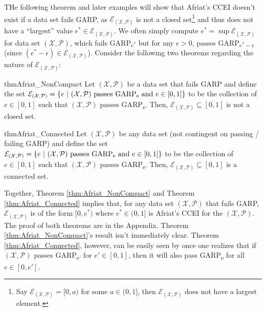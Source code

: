 \documentclass{article} %
\theoremstyle{style1}
\theoremstyle{example}
\begin{document}
THe following theorem and later examples will show that Afriat's CCEI doesn't exist if a data set fails GARP, as $\mathcal{E}_{(\mathcal{X},\mathcal{P})}$ is not a closed set\footnote{Say $\mathcal{E}_{(\mathcal{X},\mathcal{P})}=[0,a)$ for some $a\in(0,1]$, then $\mathcal{E}_{(\mathcal{X},\mathcal{P})}$ does not have a largest element.} and thus does not have a ``largest'' value $e^*\in\mathcal{E}_{(\mathcal{X},\mathcal{P})}$. We often simply compute $e^*=\sup \mathcal{E}_{(\mathcal{X},\mathcal{P})}$ for data set $(\mathcal{X},\mathcal{P})$, which fails GARP\textsubscript{$e^*$} but for any $\epsilon>0$, passes GARP\textsubscript{$e^*-\epsilon$} (since $(e^*-\epsilon)\in \mathcal{E}_{(\mathcal{X},\mathcal{P})}$). Consider the following two theorems regarding the nature of $\mathcal{E}_{(\mathcal{X},\mathcal{P})}$:

\begin{restatable}{thm}{Afriat_NonCompact}\label{thm:Afriat_NonCompact}
Let $(\mathcal{X},\mathcal{P})$ be a data set that fails GARP and define the set $\mathcal{E}_{(\mathcal{X},\mathcal{P})}=\{e\ |\ (\mathcal{X},\mathcal{P})\textrm{ passes GARP\textsubscript{e}}\textrm{ and } e\in[0,1]\}$ to be the collection of $e\in[0,1]$ such that $(\mathcal{X},\mathcal{P})$ passes GARP\textsubscript{e}. Then, $\mathcal{E}_{(\mathcal{X},\mathcal{P})}\subseteq[0,1]$ is not a closed set.
\end{restatable}

\begin{restatable}{thm}{Afriat_Connected}\label{thm:Afriat_Connected}
Let $(\mathcal{X},\mathcal{P})$ be any data set (not contingent on passing / failing GARP) and define the set $\mathcal{E}_{(\mathcal{X},\mathcal{P})}=\{e\ |\ (\mathcal{X},\mathcal{P})\textrm{ passes GARP\textsubscript{e}}\textrm{ and } e\in[0,1]\}$ to be the collection of $e\in[0,1]$ such that $(\mathcal{X},\mathcal{P})$ passes GARP\textsubscript{e}. Then, $\mathcal{E}_{(\mathcal{X},\mathcal{P})}\subseteq[0,1]$ is a connected set.
\end{restatable}

Together, Theorem \ref{thm:Afriat_NonCompact} and Theorem \ref{thm:Afriat_Connected} implies that, for any data set $(\mathcal{X},\mathcal{P})$ that fails GARP, $\mathcal{E}_{(\mathcal{X},\mathcal{P})}$ is of the form $[0,e^*)$ where $e^*\in(0,1]$ is Afriat's CCEI for the $(\mathcal{X},\mathcal{P})$. The proof of both theorems are in the Appendix. Theorem \ref{thm:Afriat_NonCompact}'s result isn't immediately clear. Theorem \ref{thm:Afriat_Connected}, however, can be easily seen by once one realizes that if $(\mathcal{X},\mathcal{P})$ passes GARP\textsubscript{e'} for $e'\in[0,1]$, then it will also pass GARP\textsubscript{e} for all $e\in[0,e']$.
\end{document}
